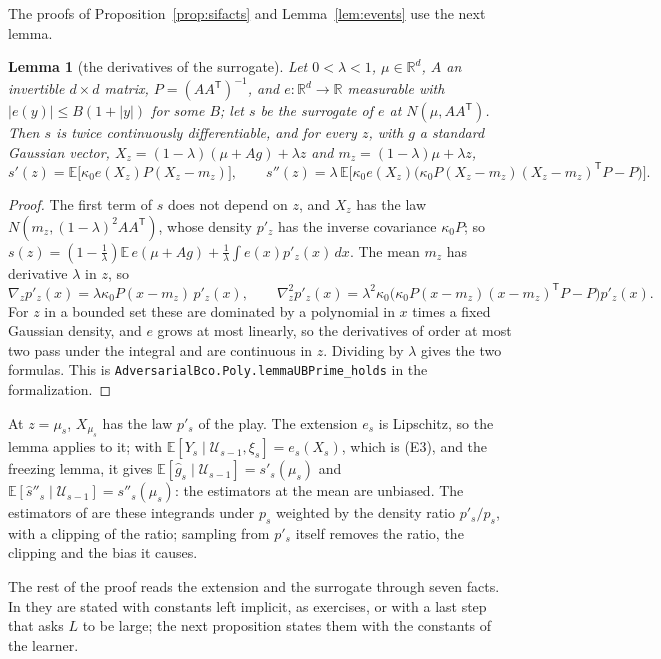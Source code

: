 \documentclass[11pt]{amsart}
\newtheorem{lemma}[theorem]{Lemma}
\theoremstyle{definition}
\numberwithin{equation}{section}
\newcommand{\R}{\mathbb{R}}
\newcommand{\E}{\mathbb{E}}
\begin{document}
The proofs of Proposition~\ref{prop:sifacts} and Lemma~\ref{lem:events} use the next lemma.

\begin{lemma}[the derivatives of the surrogate]\label{lem:ub}
Let $0<\lambda<1$, $\mu\in\R^d$, $A$ an invertible $d\times d$ matrix, $P=(AA^{\mathsf T})^{-1}$, and $e:\R^d\to\R$ measurable with $|e(y)|\le B(1+|y|)$ for some $B$; let $s$ be the surrogate of $e$ at $N(\mu,AA^{\mathsf T})$. Then $s$ is twice continuously differentiable, and for every $z$, with $g$ a standard Gaussian vector, $X_z=(1-\lambda)(\mu+Ag)+\lambda z$ and $m_z=(1-\lambda)\mu+\lambda z$,
\[
s'(z)=\E\bigl[\kappa_0e(X_z)P(X_z-m_z)\bigr],\qquad s''(z)=\lambda\,\E\bigl[\kappa_0e(X_z)\bigl(\kappa_0P(X_z-m_z)(X_z-m_z)^{\mathsf T}P-P\bigr)\bigr].
\]
\end{lemma}

\begin{proof}
The first term of $s$ does not depend on $z$, and $X_z$ has the law $N(m_z,(1-\lambda)^2AA^{\mathsf T})$, whose density $p'_z$ has the inverse covariance $\kappa_0P$; so $s(z)=(1-\frac1\lambda)\E\,e(\mu+Ag)+\frac1\lambda\int e(x)p'_z(x)\,dx$. The mean $m_z$ has derivative $\lambda$ in $z$, so
\[
\nabla_zp'_z(x)=\lambda\kappa_0P(x-m_z)\,p'_z(x),\qquad\nabla_z^2p'_z(x)=\lambda^2\kappa_0\bigl(\kappa_0P(x-m_z)(x-m_z)^{\mathsf T}P-P\bigr)p'_z(x).
\]
For $z$ in a bounded set these are dominated by a polynomial in $x$ times a fixed Gaussian density, and $e$ grows at most linearly, so the derivatives of order at most two pass under the integral and are continuous in $z$. Dividing by $\lambda$ gives the two formulas.
This is \texttt{AdversarialBco.Poly.lemmaUBPrime\_holds} in the formalization.
\end{proof}

At $z=\mu_s$, $X_{\mu_s}$ has the law $p'_s$ of the play. The extension $e_s$ is Lipschitz, so the lemma applies to it; with $\E[Y_s\mid\mathcal U_{s-1},\xi_s]=e_s(X_s)$, which is (E3), and the freezing lemma, it gives $\E[\hat g_s\mid\mathcal U_{s-1}]=s'_s(\mu_s)$ and $\E[\hat s''_s\mid\mathcal U_{s-1}]=s''_s(\mu_s)$: the estimators at the mean are unbiased. The estimators of \cite[Chapter~11]{Lat24} are these integrands under $p_s$ weighted by the density ratio $p'_s/p_s$, with a clipping of the ratio; sampling from $p'_s$ itself removes the ratio, the clipping and the bias it causes.

The rest of the proof reads the extension and the surrogate through seven facts. In \cite{Lat24} they are stated with constants left implicit, as exercises, or with a last step that asks $L$ to be large; the next proposition states them with the constants of the learner.
\end{document}
